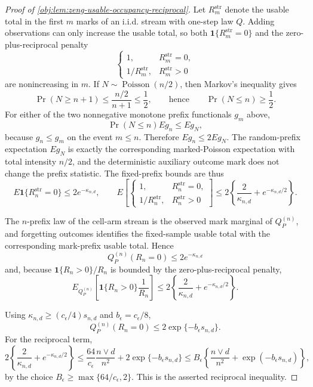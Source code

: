 \begin{proof}[Proof of \cref{obj:lem:zeng-usable-occupancy-reciprocal}]
Let \(R_m^{\mathrm{str}}\) denote the usable total in the first \(m\) marks of an i.i.d. stream with one-step law \(Q\).  Adding observations can only increase the usable total, so both \(\mathbf 1\{R_m^{\mathrm{str}}=0\}\) and the zero-plus-reciprocal penalty
\[
\begin{cases}
1,& R_m^{\mathrm{str}}=0,\\
1/R_m^{\mathrm{str}},& R_m^{\mathrm{str}}>0
\end{cases}
\]
are nonincreasing in \(m\).  If \(N\sim\operatorname{Poisson}(n/2)\), then Markov's inequality gives
\[
\Pr(N\ge n+1)\le \frac{n/2}{n+1}\le \frac12,
\qquad\text{hence}\qquad
\Pr(N\le n)\ge \frac12.
\]
For either of the two nonnegative monotone prefix functionals \(g_m\) above,
\[
\Pr(N\le n)E g_n\le E g_N,
\]
because \(g_n\le g_m\) on the event \(m\le n\).  Therefore \(E g_n\le 2E g_N\).  The random-prefix expectation \(E g_N\) is exactly the corresponding marked-Poisson expectation with total intensity \(n/2\), and the deterministic auxiliary outcome mark does not change the prefix statistic.  The fixed-prefix bounds are thus
\[
E\mathbf 1\{R_n^{\mathrm{str}}=0\}
\le 2e^{-\kappa_{n,d}},\qquad
E\left[\begin{cases}
1,& R_n^{\mathrm{str}}=0,\\
1/R_n^{\mathrm{str}},& R_n^{\mathrm{str}}>0
\end{cases}\right]
\le 2\left\{\frac{2}{\kappa_{n,d}}+e^{-\kappa_{n,d}/2}\right\}.
\]

The \(n\)-prefix law of the cell-arm stream is the observed mark marginal of \(Q_P^{(n)}\), and forgetting outcomes identifies the fixed-sample usable total with the corresponding mark-prefix usable total.  Hence
\[
Q_P^{(n)}(R_n=0)\le 2e^{-\kappa_{n,d}}
\]
and, because \(\mathbf 1\{R_n>0\}/R_n\) is bounded by the zero-plus-reciprocal penalty,
\[
E_{Q_P^{(n)}}\left[\mathbf 1\{R_n>0\}\frac1{R_n}\right]
\le
2\left\{\frac{2}{\kappa_{n,d}}+e^{-\kappa_{n,d}/2}\right\}.
\]

Using \(\kappa_{n,d}\ge(c_\epsilon/4)s_{n,d}\) and \(b_\epsilon=c_\epsilon/8\),
\[
Q_P^{(n)}(R_n=0)\le 2\exp\{-b_\epsilon s_{n,d}\}.
\]
For the reciprocal term,
\[
2\left\{\frac{2}{\kappa_{n,d}}+e^{-\kappa_{n,d}/2}\right\}
\le
\frac{64}{c_\epsilon}\frac{n\vee d}{n^2}
+2\exp\{-b_\epsilon s_{n,d}\}
\le
B_\epsilon\left\{\frac{n\vee d}{n^2}+\exp(-b_\epsilon s_{n,d})\right\},
\]
by the choice \(B_\epsilon\ge\max\{64/c_\epsilon,2\}\).  This is the asserted reciprocal inequality. %
\end{proof}
